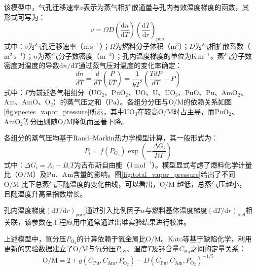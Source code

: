 该模型中，气孔迁移速率$v$表示为蒸气相扩散通量与孔内有效温度梯度的函数，其形式可写为：
\begin{equation}
	v = \Omega D \left( \frac{\mathrm{d}n}{\mathrm{d}T} \right)
	\left( \frac{\mathrm{d}T}{\mathrm{d}r} \right)_{\mathrm{pore}}
\end{equation}
\noindent 式中：$v$为气孔迁移速率（$\mathrm{m\,s^{-1}}$）；$\Omega$为燃料分子体积（$\mathrm{m^3}$）；$D$为气相扩散系数（$\mathrm{m^2\,s^{-1}}$）；$n$为蒸气分子数密度（$\mathrm{m^{-3}}$）；孔内温度梯度的单位为$\mathrm{K\,m^{-1}}$。蒸气分子数密度对温度的导数$\mathrm{d}n/\mathrm{d}T$通过蒸气压对温度的变化率确定：
\begin{equation}
	\frac{dn}{dT}=\frac{d}{dT}\left( \frac{P}{kT}\right)=\frac{1}{kT^2}\left(\frac{TdP}{dT} - P\right)
\end{equation}
\noindent 式中：$P$为前述各气相组分（$\mathrm{UO}_2$、$\mathrm{PuO}_2$、$\mathrm{UO}$、$\mathrm{U}$、$\mathrm{UO}_3$、$\mathrm{PuO}$、$\mathrm{Pu}$、$\mathrm{AmO}_2$、$\mathrm{Am}$、$\mathrm{AmO}$、$\mathrm{O}_2$）的蒸气压之和（$\mathrm{Pa}$）。各组分分压与O/M的依赖关系如图\ref{fig:species_vapor_pressure}所示，其中$\mathrm{UO}_3$在较高O/M时占主导，而$\mathrm{PuO}_2$、$\mathrm{AmO}_2$等分压则随O/M降低而显著下降。

各组分的蒸气压均基于Rand--Markin热力学模型计算，其一般形式为：
\begin{equation}
	P_i = f(P_{\mathrm{O}_2}) \exp(-\frac{\Delta G_i}{RT})
\end{equation}
\noindent 式中：$\Delta G_i=A_i-B_iT$为吉布斯自由能（$\mathrm{J\,mol^{-1}}$）。模型显式考虑了燃料化学计量比（$\mathrm{O/M}$）及$\mathrm{Pu}$、$\mathrm{Am}$含量的影响。图\ref{fig:total_vapor_pressure}给出了不同 O/M 比下总蒸气压随温度的变化曲线，可以看出，O/M 越低，总蒸气压越小，且随温度升高呈指数增长。

孔内温度梯度$(\mathrm{d}T/\mathrm{d}r)_{\mathrm{pore}}$通过引入比例因子$\alpha$与燃料基体温度梯度$(\mathrm{d}T/\mathrm{d}r)_{\mathrm{fuel}}$相关联，该参数在工程应用中通常通过出堆实验结果进行校准。

上述模型中，氧分压$P_{\mathrm{O}_2}$的计算依赖于氧金属比$\mathrm{O/M}$。Kato等\cite{katoOxygenPotentialsOxygen2017}基于缺陷化学，利用更新的实验数据建立了$\mathrm{O/M}$与氧分压$P_{\mathrm{O}2}$、温度$T$及钚含量$C{_\mathrm{Pu}}$之间的定量关系：
\begin{equation}
	\mathrm{O/M} = 2 + g(C_{\mathrm{Pu}},C_{\mathrm{Am}}, P_{\mathrm{O}_2}) - D(C_{\mathrm{Pu}},C_{\mathrm{Am}}, P_{\mathrm{O}_2})^{-1/5}
\end{equation}

